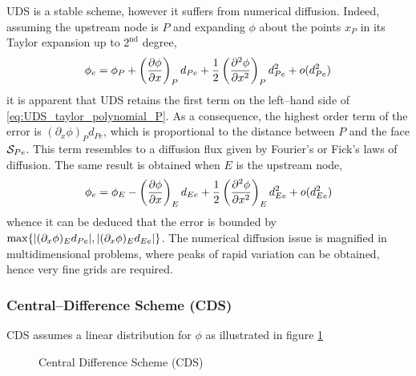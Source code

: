 UDS is a stable scheme, however it suffers from numerical diffusion. Indeed, assuming the upstream node is $P$ and expanding $\phi$ about the points $x_P$ in its Taylor expansion up to $2^\text{nd}$ degree,
\begin{equation} \label{eq:UDS_taylor_polynomial_P}
	\phi_e = 
	\phi_P + \left(\pdv{\phi}{x}\right)_P d_{Pe} + \frac{1}{2} \left(\pdv[2]{\phi}{x}\right)_P d_{Pe}^2 + o(d_{Pe}^2)
\end{equation}
it is apparent that UDS retains the first term on the left--hand side of \eqref{eq:UDS_taylor_polynomial_P}. As a consequence, the highest order term of the error is $(\partial_x \phi)_P d_{Pe}$, which is proportional to the distance between $P$ and the face $\mathcal{S}_{Pe}$. This term resembles to a diffusion flux given by Fourier's or Fick's laws of diffusion. The same result is obtained when $E$ is the upstream node,
\begin{equation}
	\phi_e = 
	\phi_E - \left(\pdv{\phi}{x}\right)_E d_{Ee} + \frac{1}{2} \left(\pdv[2]{\phi}{x}\right)_E d_{Ee}^2 + o(d_{Ee}^2)
\end{equation}
whence it can be deduced that the error is bounded by $\max\{ \abs{(\partial_x \phi)_E d_{Pe}}, \abs{(\partial_x \phi)_E d_{Ee}}\}$. The numerical diffusion issue is magnified in multidimensional problems, where peaks of rapid variation can be obtained, hence very fine grids are required. 

\subsubsection{Central--Difference Scheme (CDS)}

CDS assumes a linear distribution for $\phi$ as illustrated in figure \ref{fig:central_difference_scheme}

\begin{figure}[h]
	\centering
	\caption{Central Difference Scheme (CDS)}
	\label{fig:central_difference_scheme}
\end{figure}



